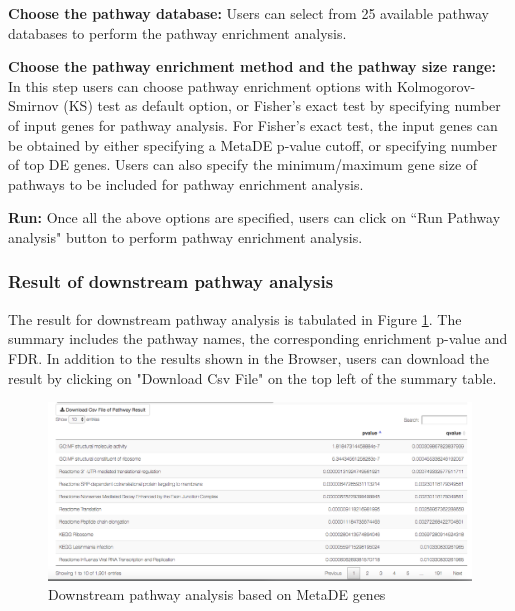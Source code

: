 \begin{steps}
\item \textbf{Choose the pathway database:}
Users can select from 25 available pathway databases to perform the pathway enrichment analysis. 

\item \textbf{Choose the pathway enrichment method and the pathway size range:}
In this step users can choose pathway enrichment options with Kolmogorov-Smirnov (KS) test as default option,
or Fisher's exact test by specifying number of input genes for pathway analysis.
For Fisher's exact test, the input genes can be obtained by either specifying a MetaDE p-value cutoff, or specifying number of top DE genes.
Users can also specify the minimum/maximum gene size of pathways to be included for pathway enrichment analysis.

\item \textbf{Run:}
Once all the above options are specified, users can click on ``Run Pathway analysis" button to perform pathway enrichment analysis.

\end{steps}


\subsubsection{Result of downstream pathway analysis}

The result for downstream pathway analysis  is tabulated in Figure \ref{fig:MetaDEresult2}. 
The summary includes the pathway names, the corresponding enrichment p-value and FDR. 
In addition to the results shown in the Browser, 
users can download the result by clicking on "Download Csv File" on the top left of the summary table. 

\begin{figure}[H]
\begin{center}
\includegraphics[scale=0.4]{./figure/metaDE/MetaDE_pathway.png}
\caption{Downstream pathway analysis based on MetaDE genes}
\label{fig:MetaDEresult2}
\end{center}
\end{figure}


